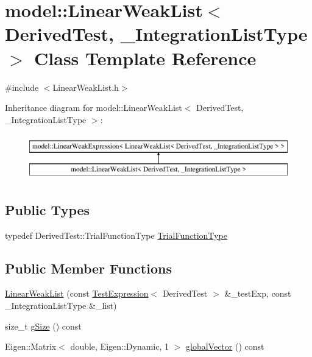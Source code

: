 \hypertarget{classmodel_1_1_linear_weak_list}{}\section{model\+:\+:Linear\+Weak\+List$<$ Derived\+Test, \+\_\+\+Integration\+List\+Type $>$ Class Template Reference}
\label{classmodel_1_1_linear_weak_list}


{\ttfamily \#include $<$Linear\+Weak\+List.\+h$>$}

Inheritance diagram for model\+:\+:Linear\+Weak\+List$<$ Derived\+Test, \+\_\+\+Integration\+List\+Type $>$\+:\begin{figure}[H]
\begin{center}
\leavevmode
\includegraphics[height=2.000000cm]{classmodel_1_1_linear_weak_list}
\end{center}
\end{figure}
\subsection*{Public Types}
\begin{DoxyCompactItemize}
\item 
typedef Derived\+Test\+::\+Trial\+Function\+Type \hyperlink{classmodel_1_1_linear_weak_list_ab47b0154ac5d860c652b676bfc0c7c8b}{Trial\+Function\+Type}
\end{DoxyCompactItemize}
\subsection*{Public Member Functions}
\begin{DoxyCompactItemize}
\item 
\hyperlink{classmodel_1_1_linear_weak_list_a540cc5330ef504255dd1b9cf1366173a}{Linear\+Weak\+List} (const \hyperlink{structmodel_1_1_test_expression}{Test\+Expression}$<$ Derived\+Test $>$ \&\+\_\+test\+Exp, const \+\_\+\+Integration\+List\+Type \&\+\_\+list)
\item 
size\+\_\+t \hyperlink{classmodel_1_1_linear_weak_list_a3b45dc845347a81e96ba74dd8b27c095}{g\+Size} () const 
\item 
Eigen\+::\+Matrix$<$ double, Eigen\+::\+Dynamic, 1 $>$ \hyperlink{classmodel_1_1_linear_weak_list_acc65e442476c94b050480a75805c184c}{global\+Vector} () const 
\end{DoxyCompactItemize}

